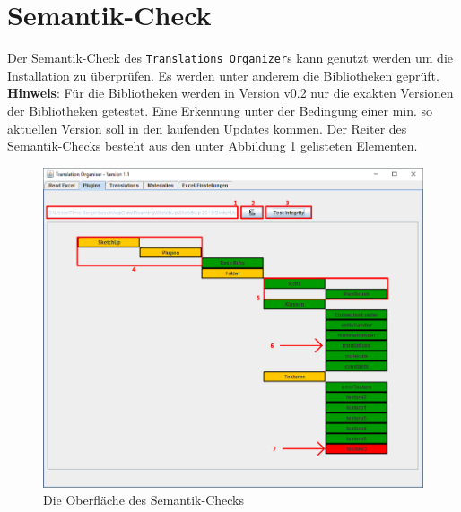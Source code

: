 \documentclass{book}
\newcommand{\assisttool}{\texttt{Translations Organizer}}
\newcommand{\hinweis}[1]{\newline \textbf{Hinweis}: #1 \newline}
\begin{document}
		\section{Semantik-Check}\label{semantic check}
			Der Semantik-Check des \assisttool s kann genutzt werden um die Installation zu überprüfen. Es werden unter anderem die Bibliotheken geprüft. 
			\hinweis{Für die Bibliotheken werden in Version v0.2 nur die exakten Versionen der Bibliotheken getestet. Eine Erkennung unter der Bedingung einer min. so aktuellen Version soll in den laufenden Updates kommen.}
			Der Reiter des Semantik-Checks besteht aus den unter \hyperref[fig:semantik check]{Abbildung \ref{fig:semantik check}} gelisteten Elementen.				
			
			\begin{figure}
				\centering
				\includegraphics[scale=0.48]{pics/assisttool/semantik-check.png}
				\caption{Die Oberfläche des Semantik-Checks}
				\label{fig:semantik check}
			\end{figure}
		
\end{document}
